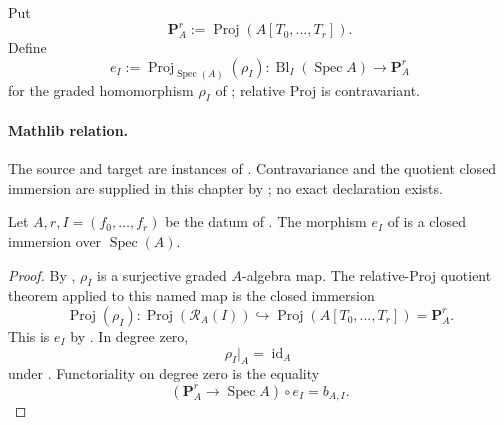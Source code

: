 \begin{definition}
  \label{def:nagata-affine-blowup-projective-embedding}
  \lean{}

  Put
  \[
    \mathbf P_A^r:=\operatorname{Proj}(A[T_0,\ldots,T_r]).
  \]
  Define
  \[
    e_I:=\operatorname{Proj}_{\operatorname{Spec}(A)}(\rho_I)
      \colon\operatorname{Bl}_I(\operatorname{Spec}A)
      \longrightarrow\mathbf P^r_A
  \]
  for the graded homomorphism $\rho_I$ of
  ; relative Proj is contravariant.

  \paragraph{Mathlib relation.}
  The source and target are instances of
  \texttt{}.  Contravariance and the
  quotient closed immersion are supplied in this chapter by
  ; no exact
  \texttt{} declaration exists.
\end{definition}

\begin{lemma}
  \label{lemma:nagata-affine-blowup-projective-embedding}
  \lean{}

  Let $A,r,I=(f_0,\ldots,f_r)$ be the datum of
  .
  The morphism $e_I$ of
   is a closed immersion
  over
  $\operatorname{Spec}(A)$.
\end{lemma}

\begin{proof}
  By , $\rho_I$ is a surjective
  graded $A$-algebra map.  The relative-Proj quotient theorem applied to
  this named map is the closed immersion
  \[
    \operatorname{Proj}(\rho_I)\colon
      \operatorname{Proj}(\mathcal R_A(I))
      \hookrightarrow\operatorname{Proj}(A[T_0,\ldots,T_r])
      =\mathbf P_A^r.
  \]
  This is $e_I$ by
  .  In degree zero,
  \[
    \rho_I|_A=\operatorname{id}_A
  \]
  under .  Functoriality on degree zero
  is the equality
  \[
    (\mathbf P_A^r\to\operatorname{Spec}A)\circ e_I=b_{A,I}.
  \]
\end{proof}


